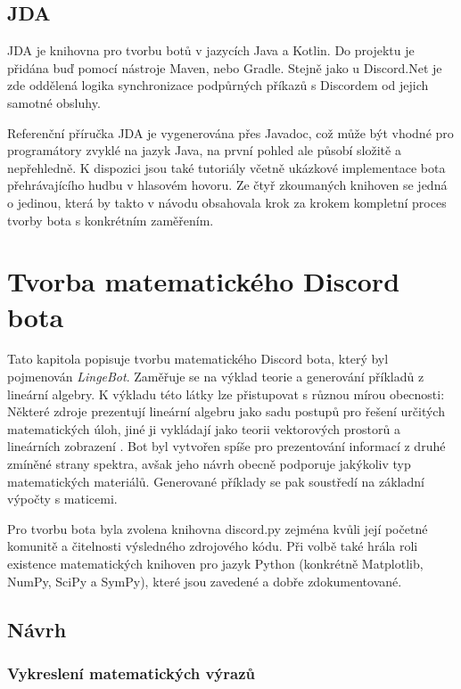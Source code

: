 \documentclass[FM]{tulthesis}
\begin{document}
	\section{JDA}
	
	JDA je knihovna pro tvorbu botů v jazycích Java a Kotlin. Do projektu je přidána buď pomocí nástroje Maven, nebo Gradle. Stejně jako u Discord.Net je zde oddělená logika synchronizace podpůrných příkazů s Discordem od jejich samotné obsluhy.
	
	Referenční příručka JDA je vygenerována přes Javadoc, což může být vhodné pro programátory zvyklé na jazyk Java, na první pohled ale působí složitě a nepřehledně. K dispozici jsou také tutoriály včetně ukázkové implementace bota přehrávajícího hudbu v hlasovém hovoru. Ze čtyř zkoumaných knihoven se jedná o jedinou, která by takto v návodu obsahovala krok za krokem kompletní proces tvorby bota s konkrétním zaměřením.
	
	\chapter{Tvorba matematického Discord bota}\label{Chapter5}
	
	Tato kapitola popisuje tvorbu matematického Discord bota, který byl pojmenován \textit{LingeBot}. Zaměřuje se na výklad teorie a generování příkladů z lineární algebry. K výkladu této látky lze přistupovat s různou mírou obecnosti: Některé zdroje prezentují lineární algebru jako sadu postupů pro řešení určitých matematických úloh, jiné ji vykládají jako teorii vektorových prostorů a lineárních zobrazení \cite{lit_lingebra}. Bot byl vytvořen spíše pro prezentování informací z druhé zmíněné strany spektra, avšak jeho návrh obecně podporuje jakýkoliv typ matematických materiálů. Generované příklady se pak soustředí na základní výpočty s maticemi.
	
	Pro tvorbu bota byla zvolena knihovna discord.py zejména kvůli její početné komunitě a čitelnosti výsledného zdrojového kódu. Při volbě také hrála roli existence matematických knihoven pro jazyk Python (konkrétně Matplotlib, NumPy, SciPy a SymPy), které jsou zavedené a dobře zdokumentované.
		
	\section{Návrh}
	
	\subsection{Vykreslení matematických výrazů}
	
\end{document}
